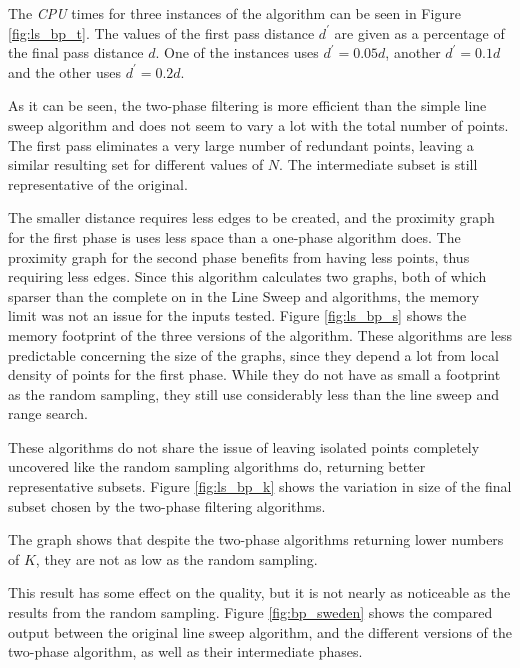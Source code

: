 

The \emph{CPU} times for three instances of the algorithm can be seen in Figure \ref{fig:ls_bp_t}. The values of the first pass distance $d^\prime$ are given as a percentage of the final pass distance $d$. One of the instances uses $d^\prime=0.05d$, another $d^\prime=0.1d$ and the other uses $d^\prime=0.2d$.

As it can be seen, the two-phase filtering is more efficient than the simple line sweep algorithm and does not seem to vary a lot with the total number of points. The first pass eliminates a very large number of redundant points, leaving a similar resulting set for different values of $N$. The intermediate subset is still representative of the original. 

The smaller distance requires less edges to be created, and the proximity graph for the first phase is uses less space than a one-phase algorithm does. The proximity graph for the second phase benefits from having less points, thus requiring less edges. Since this algorithm calculates two graphs, both of which sparser than the complete on in the Line Sweep and \kdtree algorithms, the memory limit was not an issue for the inputs tested. Figure \ref{fig:ls_bp_s} shows the memory footprint of the three versions of the algorithm. These algorithms are less predictable concerning the size of the graphs, since they depend a lot from local density of points for the first phase. While they do not have as small a footprint as the random sampling, they still use considerably less than the line sweep and \kdtree range search. 

These algorithms do not share the issue of leaving isolated points completely uncovered like the random sampling algorithms do, returning better representative subsets. Figure \ref{fig:ls_bp_k} shows the variation in size of the final subset chosen by the two-phase filtering algorithms.

The graph shows that despite the two-phase algorithms returning lower numbers of $K$, they are not as low as the random sampling. 





This result has some effect on the quality, but it is not nearly as noticeable as the results from the random sampling. Figure \ref{fig:bp_sweden} shows the compared output between the original line sweep algorithm, and the different versions of the two-phase algorithm, as well as their intermediate phases.


